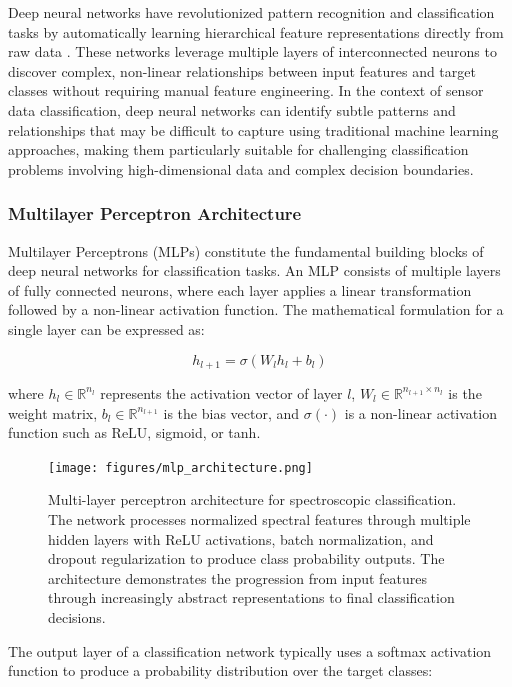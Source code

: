 Deep neural networks have revolutionized pattern recognition and classification tasks by automatically learning hierarchical feature representations directly from raw data
\cite{deep_learning_ref}. These networks leverage multiple layers of interconnected neurons to discover complex, non-linear relationships between input features and target classes without
requiring manual feature engineering. In the context of sensor data classification, deep neural networks can identify subtle patterns and relationships that may be difficult to capture using
traditional machine learning approaches, making them particularly suitable for challenging classification problems involving high-dimensional data and complex decision boundaries.

\subsubsection{Multilayer Perceptron Architecture}

Multilayer Perceptrons (MLPs) constitute the fundamental building blocks of deep neural networks for classification tasks. An MLP consists of multiple layers of fully connected neurons, where each
layer applies a linear transformation followed by a non-linear activation function. The mathematical formulation for a single layer can be expressed as:

\begin{equation}
h_{l+1} = \sigma(W_l h_l + b_l)
\end{equation}

where $h_l \in \mathbb{R}^{n_l}$ represents the activation vector of layer $l$, $W_l \in \mathbb{R}^{n_{l+1} \times n_l}$ is the weight matrix, $b_l \in \mathbb{R}^{n_{l+1}}$ is the bias vector,
and $\sigma(\cdot)$ is a non-linear activation function such as ReLU, sigmoid, or tanh.

\begin{figure}[htbp]
  \centering
  \texttt{[image: figures/mlp\_architecture.png]}
  \caption{Multi-layer perceptron architecture for spectroscopic classification. The network processes normalized spectral features through multiple hidden layers with ReLU activations, batch
normalization, and dropout regularization to produce class probability outputs. The architecture demonstrates the progression from input features through increasingly abstract representations to
final classification decisions.}
  \label{fig:mlp_architecture}
\end{figure}

The output layer of a classification network typically uses a softmax activation function to produce a probability distribution over the target classes:

